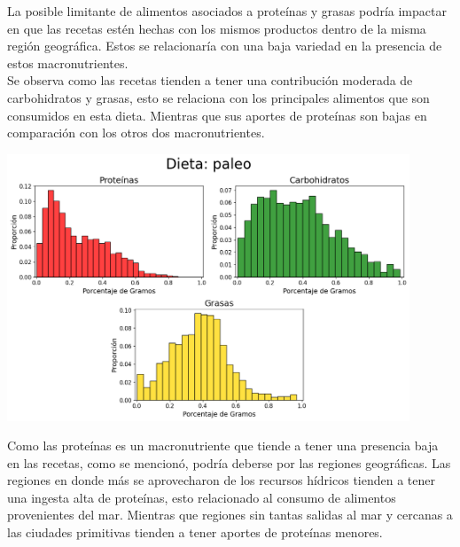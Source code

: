 \documentclass[12pt,a4paper]{article}
\begin{document}
            La posible limitante de alimentos asociados a proteínas	y grasas 
            podría impactar en que las recetas estén hechas con los mismos productos 
            dentro de la misma región geográfica. Estos se relacionaría con una 
            baja variedad en la presencia de estos macronutrientes.\\

            Se observa como las recetas tienden a tener una contribución moderada de 
            carbohidratos y grasas, esto se relaciona con los principales alimentos 
            que son consumidos en esta dieta. Mientras que sus aportes de proteínas 
            son bajas en comparación con los otros dos macronutrientes.
            
            \begin{center}
                \includegraphics[width=0.90\textwidth]{Resources/2_03_plot_04.png}
            \end{center}

            Como las proteínas es un macronutriente que tiende a tener una presencia 
            baja en las recetas, como se mencionó, podría deberse por las regiones geográficas. 
            Las regiones en donde más se aprovecharon de los recursos hídricos tienden a tener 
            una ingesta alta de proteínas, esto relacionado al consumo de alimentos provenientes 
            del mar. Mientras que regiones sin tantas salidas al mar y cercanas a las ciudades 
            primitivas tienden a tener aportes de proteínas	menores.
\end{document}
